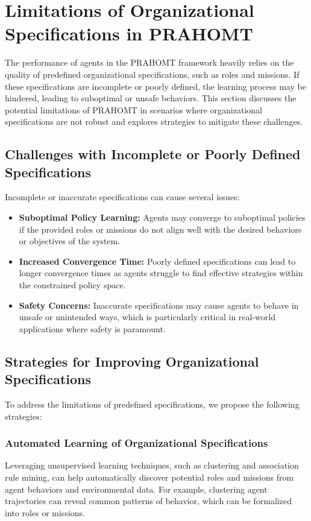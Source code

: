 \documentclass[sigconf,anonymous]{aamas}
\begin{document}
\section{Limitations of Organizational Specifications in PRAHOMT}
\label{sec:limitations}

The performance of agents in the PRAHOMT framework heavily relies on the quality of predefined organizational specifications, such as roles and missions. If these specifications are incomplete or poorly defined, the learning process may be hindered, leading to suboptimal or unsafe behaviors. This section discusses the potential limitations of PRAHOMT in scenarios where organizational specifications are not robust and explores strategies to mitigate these challenges.

\subsection{Challenges with Incomplete or Poorly Defined Specifications}

Incomplete or inaccurate specifications can cause several issues:
\begin{itemize}
    \item \textbf{Suboptimal Policy Learning:} Agents may converge to suboptimal policies if the provided roles or missions do not align well with the desired behaviors or objectives of the system.
    \item \textbf{Increased Convergence Time:} Poorly defined specifications can lead to longer convergence times as agents struggle to find effective strategies within the constrained policy space.
    \item \textbf{Safety Concerns:} Inaccurate specifications may cause agents to behave in unsafe or unintended ways, which is particularly critical in real-world applications where safety is paramount.
\end{itemize}

\subsection{Strategies for Improving Organizational Specifications}

To address the limitations of predefined specifications, we propose the following strategies:

\subsubsection{Automated Learning of Organizational Specifications}
Leveraging unsupervised learning techniques, such as clustering and association rule mining, can help automatically discover potential roles and missions from agent behaviors and environmental data. For example, clustering agent trajectories can reveal common patterns of behavior, which can be formalized into roles or missions.
\end{document}

